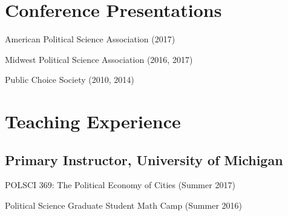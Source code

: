 \documentclass[letterpaper]{article}
\renewenvironment{itemize}{
  \begin{list}{}{
    \setlength{\leftmargin}{1.5em}
  }
}{
  \end{list}
}
\begin{document}
\hrulefill

\section*{Conference Presentations}
\begin{itemize}
\item American Political Science Association (2017)
\item Midwest Political Science Association (2016, 2017)
\item Public Choice Society (2010, 2014)
\end{itemize}

\hrulefill

\section*{Teaching Experience}

\subsection*{Primary Instructor, University of Michigan}
\begin{itemize}
\item POLSCI 369: The Political Economy of Cities  (Summer 2017)
\item Political Science Graduate Student Math Camp (Summer 2016)
\end{itemize}
\end{document}
